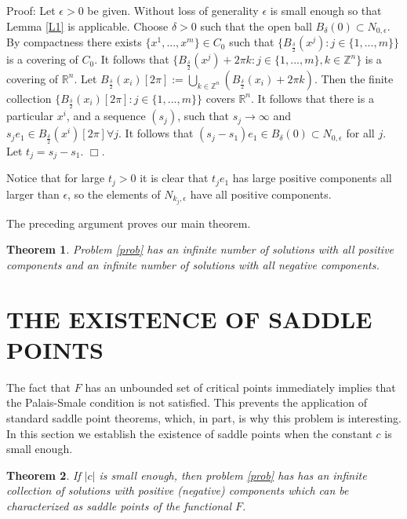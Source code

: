 \documentclass[twoside]{article}
\newtheorem{theorem}{Theorem}[section]
\newcommand{\R}{{\mathbb R}}
\newcommand{\Z}{{\mathbb Z}}
\begin{document}
Proof: Let $\epsilon>0$ be given. Without loss of generality $\epsilon$ is small enough so that Lemma \ref{L1} is applicable. Choose $\delta>0$ such that the open ball $B_{\delta}(0)\subset N_{0,\epsilon}$. By compactness there exists $\{x^1,...,x^m\}\in C_0$ such that $\{B_{\frac{\delta}{2}}(x^j):j\in\{1,...,m\}\}$ is a covering of $C_0$. It follows that
$\{B_{\frac{\delta}{2}}(x^j)+2\pi k: j\in\{1,...,m\}, k\in\Z^n\}$ is a covering of $\R^n$. Let $B_{\frac{\delta}{2}}(x_i)[2\pi]:=\bigcup_{k\in\Z^n}(B_{\frac{\delta}{2}}(x_i)+2\pi k)$. Then the finite collection $\{B_{\frac{\delta}{2}}(x_i)[2\pi]:j\in\{1,...,m\}\}$ covers $\R^n$. It follows that there is a particular $x^i$, and a sequence $(s_j)$, such that $s_j\rightarrow\infty$ and $s_je_1\in B_{\frac{\delta}{2}}(x^i)[2\pi]\forall j$. It follows that $(s_j-s_1)e_1\in B_{\delta}(0)\subset N_{0,\epsilon}$ for all $j$. Let $t_j=s_j-s_1$. $\Box$.

Notice that for large $t_j>0$ it is clear that $t_je_1$ has large positive components all larger than $\epsilon$, so the elements of $N_{k_j,\epsilon}$ have all positive components.

The preceding argument proves our main theorem.

\begin{theorem} Problem \eqref{prob} has an infinite number of solutions with all positive components and an infinite number of solutions with all negative components.
\end{theorem}

\section{THE EXISTENCE OF SADDLE POINTS}
The fact that $F$ has an unbounded set of critical points immediately implies that the Palais-Smale condition is not satisfied. This prevents the application of standard saddle point theorems, which, in part, is why this problem is interesting. In this section we establish the existence of saddle points when the constant $c$ is small enough.

\begin{theorem}
If $|c|$ is small enough, then problem \eqref{prob} has has an infinite collection of solutions with positive (negative) components which can be characterized as saddle points of the functional $F$.
\end{theorem}
\end{document}
